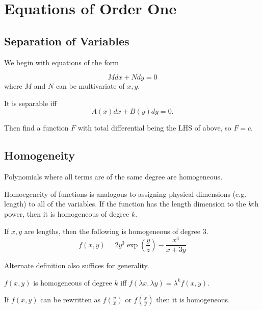 \section{Equations of Order One}

\subsection{Separation of Variables}

We begin with equations of the form

\begin{equation}
    Mdx+Ndy=0
\end{equation}
where $M$ and $N$ can be multivariate of $x,y$.

It is separable iff
\begin{equation}
    A(x)dx+B(y)dy=0.
\end{equation}

Then find a function $F$ with total differential being the LHS of above, so $F=c$.

\subsection{Homogeneity}

\begin{definition}
    Polynomials where all terms are of the same degree are homogeneous.
\end{definition}

Homoegeneity of functions is analogous to assigning physical dimensions (e.g. length) to all of the variables.
If the function has the length dimension to the $k$th power, then it is homogeneous of degree $k$.

\begin{example}
    If $x,y$ are lengths, then the following is homogeneous of degree 3.
    \begin{equation}
        f(x,y)=2y^3\exp(\frac{y}{z})-\frac{x^4}{x+3y}
    \end{equation}
\end{example}

Alternate definition also suffices for generality.

\begin{definition}
    $f(x,y)$ is homogeneous of degree $k$ iff $f(\lambda x, \lambda y)=\lambda^kf(x,y)$.
\end{definition}

\begin{definition}
    If $f(x,y)$ can be rewritten as $f(\frac{y}{x})$ or $f(\frac{x}{y})$ then it is homogeneous.
\end{definition}

